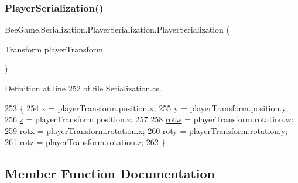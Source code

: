 \subsubsection{\texorpdfstring{Player\+Serialization()}{PlayerSerialization()}\hspace{0.1cm}{\footnotesize\ttfamily [2/2]}}
{\footnotesize\ttfamily Bee\+Game.\+Serialization.\+Player\+Serialization.\+Player\+Serialization (\begin{DoxyParamCaption}\item[{Transform}]{player\+Transform }\end{DoxyParamCaption})}



Definition at line 252 of file Serialization.\+cs.


\begin{DoxyCode}
253         \{
254             \hyperlink{class_bee_game_1_1_serialization_1_1_player_serialization_a36758d72f4f33b21f296f5e648b772a5}{x} = playerTransform.position.x;
255             \hyperlink{class_bee_game_1_1_serialization_1_1_player_serialization_ada22143d639a1fbd59b52943362202ae}{y} = playerTransform.position.y;
256             \hyperlink{class_bee_game_1_1_serialization_1_1_player_serialization_a9836712a8e5f645bea8304e50fb84e51}{z} = playerTransform.position.z;
257 
258             \hyperlink{class_bee_game_1_1_serialization_1_1_player_serialization_af292d134d5b6171724f6797e390bde77}{rotw} = playerTransform.rotation.w;
259             \hyperlink{class_bee_game_1_1_serialization_1_1_player_serialization_a5c7c1d06654a4aad49a3fb3b9cd11835}{rotx} = playerTransform.rotation.x;
260             \hyperlink{class_bee_game_1_1_serialization_1_1_player_serialization_a5411f99b7942e8d4f848b001fc49c39f}{roty} = playerTransform.rotation.y;
261             \hyperlink{class_bee_game_1_1_serialization_1_1_player_serialization_adfa5b8ed3fa3ef68460302186054dae5}{rotz} = playerTransform.rotation.z;
262         \}
\end{DoxyCode}


\subsection{Member Function Documentation}
\mbox{\label{class_bee_game_1_1_serialization_1_1_player_serialization_a0c8bfc459f24a64f9e6d39305dba1fb2}} 
